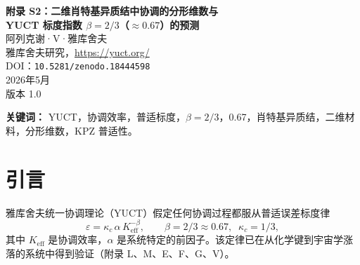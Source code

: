 \documentclass[12pt,a4paper]{article}
\newcommand{\Keff}{K_{\mathrm{eff}}}
\begin{document}
	
	\begin{titlepage}
		\centering
		\vspace*{1cm}
		{\Huge\bfseries 附录 S2：二维肖特基异质结中协调的分形维数与 \\ YUCT 标度指数 $\beta = 2/3$（$\approx 0.67$）的预测}\\[1cm]
		{\large 阿列克谢·V·雅库舍夫}\\[0.3cm]
		{\normalsize 雅库舍夫研究，\url{https://yuct.org/}}\\[1.5cm]
		{\normalsize DOI：\texttt{10.5281/zenodo.18444598}}\\[0.5cm]
		{\normalsize 2026年5月\\版本 1.0}\\[2cm]
		
		\begin{minipage}{0.9\textwidth}
			\begin{abstract}
				\noindent
				Ang、Yang 和 Ang（Phys. Rev. Lett. 121, 056802, 2018）发现二维肖特基异质结中存在普适的电流-温度标度律：对于横向接触为 $\log(\mathcal{I}/T^{3/2}) \propto -1/T$，对于动量不守恒的垂直接触为 $\log(\mathcal{I}/T^{1}) \propto -1/T$。在本附录中，我们表明这两个指数都由控制输运的协调网络的有效分形维数 $d_f$ 决定。YUCT 普适误差标度律 $\varepsilon = \kappa_c\alpha K_{\mathrm{eff}}^{-\beta}$ 且 $\beta = 2/3 \approx 0.67$ 通过 $\beta = 2/d_f$ 与 $d_f$ 相关联。从实验电流标度我们提取出横向接触的 $d_f = 3$ 和垂直接触的 $d_f = 2$，它们分别给出 $\beta = 2/3$ 和 $\beta = 1$。该分析预测横向肖特基二极管中的相对电流涨落应遵循 $\varepsilon_{\mathrm{fluc}} \propto K_{\mathrm{eff}}^{-2/3}$，这是一个可以用标准噪声谱学检验的可证伪预测。这项工作将二维肖特基异质结纳入展现或预测将展现 YUCT 普适指数 $\beta = 2/3$（$0.67$）的系统家族中，将理论的范围扩展到固态纳米电子学。
			\end{abstract}
			\vspace{1cm}
			\noindent\small\textbf{关键词：} YUCT，协调效率，普适标度，$\beta = 2/3$，0.67，肖特基异质结，二维材料，分形维数，KPZ 普适性。
		\end{minipage}
	\end{titlepage}
	
	\tableofcontents
	\newpage
	
	\section{引言}
	雅库舍夫统一协调理论（YUCT）假定任何协调过程都服从普适误差标度律
	\begin{equation}
		\varepsilon = \kappa_c \, \alpha \, \Keff^{-\beta},
		\qquad \beta = 2/3 \approx 0.67,\;\; \kappa_c = 1/3,
		\label{eq:yuct-law}
	\end{equation}
	其中 $\Keff$ 是协调效率，$\alpha$ 是系统特定的前因子。该定律已在从化学键到宇宙学涨落的系统中得到验证（附录 L、M、E、F、G、V）。
	
\end{document}
